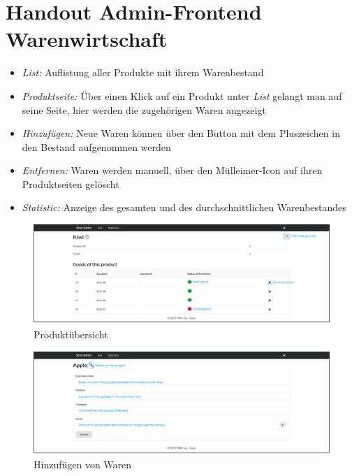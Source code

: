 







\section*{Handout Admin-Frontend Warenwirtschaft}

\begin{itemize}
	\item \textit{List:} Auflistung aller Produkte mit ihrem Warenbestand
	\item \textit{Produktseite:} Über einen Klick auf ein Produkt unter \textit{List} gelangt man auf seine Seite, hier werden die zugehörigen Waren angezeigt
	\item \textit{Hinzufügen:} Neue Waren können über den Button mit dem Pluszeichen in den Bestand aufgenommen werden
	\item \textit{Entfernen:} Waren werden manuell, über den Mülleimer-Icon auf ihren Produktseiten gelöscht
	\item \textit{Statistic:} Anzeige des gesamten und des durchschnittlichen Warenbestandes
	
\end{itemize}

\begin{figure}[H]
	\centering
	\includegraphics[width=1 \textwidth]{./product_handout.png}
	\caption{Produktübersicht}
\end{figure}

\begin{figure}[H]
	\centering
	\includegraphics[width=1 \textwidth]{./add_handout.png}
	\caption{Hinzufügen von Waren}
\end{figure}

